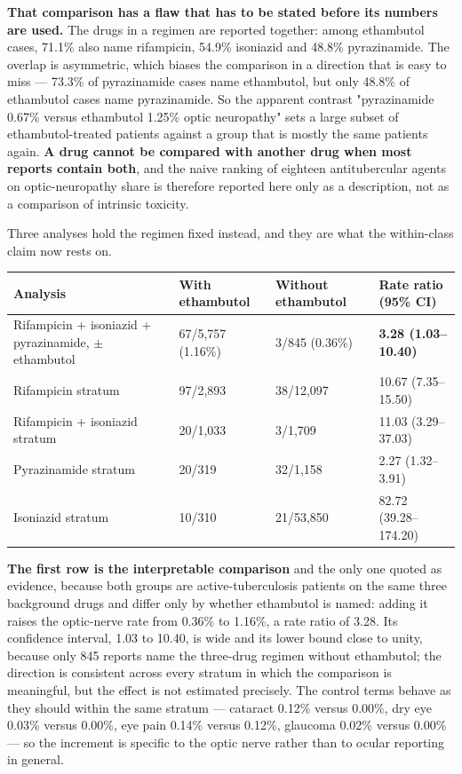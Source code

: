 \documentclass[utf8]{FrontiersinVancouver}
\begin{document}
\textbf{That comparison has a flaw that has to be stated before its numbers are used.} The drugs in a regimen are reported together: among ethambutol cases, 71.1\% also name rifampicin, 54.9\% isoniazid and 48.8\% pyrazinamide. The overlap is asymmetric, which biases the comparison in a direction that is easy to miss --- 73.3\% of pyrazinamide cases name ethambutol, but only 48.8\% of ethambutol cases name pyrazinamide. So the apparent contrast "pyrazinamide 0.67\% versus ethambutol 1.25\% optic neuropathy" sets a large subset of ethambutol-treated patients against a group that is mostly the same patients again. \textbf{A drug cannot be compared with another drug when most reports contain both}, and the naive ranking of eighteen antitubercular agents on optic-neuropathy share is therefore reported here only as a description, not as a comparison of intrinsic toxicity.

Three analyses hold the regimen fixed instead, and they are what the within-class claim now rests on.

\begin{table}[htbp]
\centering
\begin{tabular}{llll}
\hline
Analysis & With ethambutol & Without ethambutol & Rate ratio (95\% CI) \\
\hline
Rifampicin + isoniazid + pyrazinamide, $\pm$ ethambutol & 67/5,757 (1.16\%) & 3/845 (0.36\%) & \textbf{3.28 (1.03--10.40)} \\
Rifampicin stratum & 97/2,893 & 38/12,097 & 10.67 (7.35--15.50) \\
Rifampicin + isoniazid stratum & 20/1,033 & 3/1,709 & 11.03 (3.29--37.03) \\
Pyrazinamide stratum & 20/319 & 32/1,158 & 2.27 (1.32--3.91) \\
Isoniazid stratum & 10/310 & 21/53,850 & 82.72 (39.28--174.20) \\
\hline
\end{tabular}
\end{table}

\textbf{The first row is the interpretable comparison} and the only one quoted as evidence, because both groups are active-tuberculosis patients on the same three background drugs and differ only by whether ethambutol is named: adding it raises the optic-nerve rate from 0.36\% to 1.16\%, a rate ratio of 3.28. Its confidence interval, 1.03 to 10.40, is wide and its lower bound close to unity, because only 845 reports name the three-drug regimen without ethambutol; the direction is consistent across every stratum in which the comparison is meaningful, but the effect is not estimated precisely. The control terms behave as they should within the same stratum --- cataract 0.12\% versus 0.00\%, dry eye 0.03\% versus 0.00\%, eye pain 0.14\% versus 0.12\%, glaucoma 0.02\% versus 0.00\% --- so the increment is specific to the optic nerve rather than to ocular reporting in general.
\end{document}

